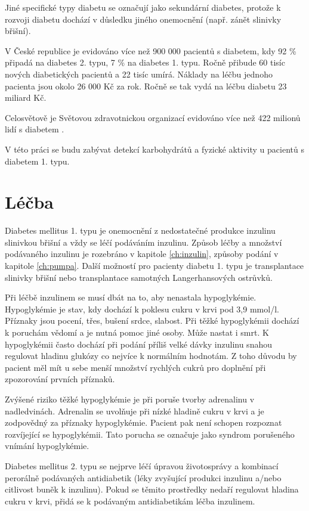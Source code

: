 Jiné specifické typy diabetu se označují jako sekundární diabetes, protože k rozvoji diabetu dochází v důsledku jiného onemocnění (např. zánět slinivky břišní).

V České republice je evidováno více než 900 000 pacientů s diabetem, kdy 92 \% připadá na diabetes 2. typu, 7 \% na diabetes 1. typu. Ročně přibude 60 tisíc nových diabetických pacientů a 22 tisíc umírá. Náklady na léčbu jednoho pacienta jsou okolo 26 000 Kč za rok. Ročně se tak vydá na léčbu diabetu 23 miliard Kč. \cite{Diabetes.Psottova,cukrovka.cz,Diabetes.TaiN}

Celosvětově je Světovou zdravotnickou organizací evidováno více než 422 milionů lidí s diabetem \cite{WHO}.

V této práci se budu zabývat detekcí karbohydrátů a fyzické aktivity u pacientů s diabetem 1. typu.


\section{Léčba}

Diabetes mellitus 1. typu je onemocnění z nedostatečné produkce inzulinu slinivkou břišní a vždy se léčí podáváním inzulinu. Způsob léčby a množství podávaného inzulinu je rozebráno v kapitole \ref{ch:inzulin}, způsoby podání v kapitole \ref{ch:pumpa}. Další možností pro pacienty diabetu 1. typu je transplantace slinivky břišní nebo transplantace samotných Langerhansových ostrůvků.

Při léčbě inzulinem se musí dbát na to, aby nenastala hypoglykémie. Hypoglykémie je stav, kdy dochází k poklesu cukru v krvi pod 3,9 mmol/l. Příznaky jsou pocení, třes, bušení srdce, slabost. Při těžké hypoglykémii dochází k poruchám vědomí a je nutná pomoc jiné osoby. Může nastat i smrt. K hypoglykémii často dochází při podání příliš velké dávky inzulinu snahou regulovat hladinu glukózy co nejvíce k normálním hodnotám. Z toho důvodu by pacient měl mít u sebe menší množství rychlých cukrů pro doplnění při zpozorování prvních příznaků.

Zvýšené riziko těžké hypoglykémie je při poruše tvorby adrenalinu v nadledvinách. Adrenalin se uvolňuje při nízké hladině cukru v krvi a je zodpovědný za příznaky hypoglykémie. Pacient pak není schopen rozpoznat rozvíjející se hypoglykémii. Tato porucha se označuje jako syndrom porušeného vnímání hypoglykémie.

Diabetes mellitus 2. typu se nejprve léčí úpravou životosprávy a kombinací perorálně podávaných antidiabetik (léky zvyšující produkci inzulinu a/nebo citlivost buněk k inzulinu). Pokud se těmito prostředky nedaří regulovat hladina cukru v krvi, přidá se k podávaným antidiabetikám léčba inzulinem.

